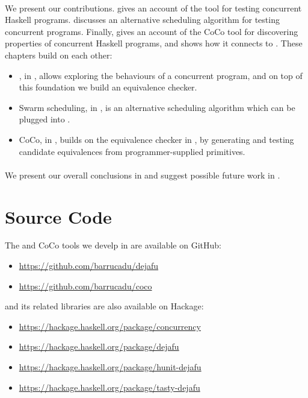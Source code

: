 \paragraph{}
We present our contributions.   gives an account of
the \dejafu{} tool for testing concurrent Haskell programs.
 discusses an alternative scheduling algorithm
for testing concurrent programs.  Finally,  gives an
account of the CoCo tool for discovering properties of concurrent
Haskell programs, and shows how it connects to \dejafu{}.  These
chapters build on each other:

\begin{itemize}
\item \dejafu{}, in , allows exploring the behaviours
  of a concurrent program, and on top of this foundation we build an
  equivalence checker.
\item Swarm scheduling, in , is an alternative
  scheduling algorithm which can be plugged into \dejafu{}.
\item CoCo, in , builds on the equivalence checker in
  \dejafu{}, by generating and testing candidate equivalences from
  programmer-supplied primitives.
\end{itemize}

\paragraph{}
We present our overall conclusions in  and
suggest possible future work in .

\section{Source Code}

The \dejafu{} and CoCo tools we develp in  are
available on GitHub:

\begin{itemize}
\item \url{https://github.com/barrucadu/dejafu}
\item \url{https://github.com/barrucadu/coco}
\end{itemize}

\noindent
\dejafu{} and its related libraries are also available on Hackage:

\begin{itemize}
\item \url{https://hackage.haskell.org/package/concurrency}
\item \url{https://hackage.haskell.org/package/dejafu}
\item \url{https://hackage.haskell.org/package/hunit-dejafu}
\item \url{https://hackage.haskell.org/package/tasty-dejafu}
\end{itemize}
